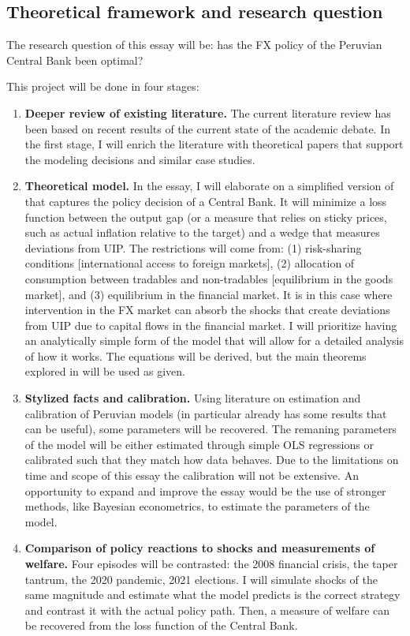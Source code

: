 \documentclass[12pt,a4paper]{article}
\begin{document}
\subsection{Theoretical framework and research question}

The research question of this essay will be: has the FX policy of the Peruvian Central Bank been optimal? 

This project will be done in four stages:

\begin{enumerate}
    \item \textbf{Deeper review of existing literature.} The current literature review has been based on recent results of the current state of the academic debate. In the first stage, I will enrich the literature with theoretical papers that support the modeling decisions and similar case studies.
    
    \item \textbf{Theoretical model.} In the essay, I will elaborate on a simplified version of \cite{itskhokimukhin2025} that captures the policy decision of a Central Bank. It will minimize a loss function between the output gap (or a measure that relies on sticky prices, such as actual inflation relative to the target) and a wedge that measures deviations from UIP. The restrictions will come from: (1) risk-sharing conditions [international access to foreign markets], (2) allocation of consumption between tradables and non-tradables [equilibrium in the goods market], and (3) equilibrium in the financial market. It is in this case where intervention in the FX market can absorb the shocks that create deviations from UIP due to capital flows in the financial market. I will prioritize having an analytically simple form of the model that will allow for a detailed analysis of how it works. The equations will be derived, but the main theorems explored in \cite{itskhokimukhin2025} will be used as given.
    
    \item \textbf{Stylized facts and calibration.} Using literature on estimation and calibration of Peruvian models (in particular \cite{MONTORO2023102825} already has some results that can be useful), some parameters will be recovered. The remaning parameters of the model will be either estimated through simple OLS regressions or calibrated such that they match how data behaves. Due to the limitations on time and scope of this essay the calibration will not be extensive. An opportunity to expand and improve the essay would be the use of stronger methods, like Bayesian econometrics, to estimate the parameters of the model.
    
    \item \textbf{Comparison of policy reactions to shocks and measurements of welfare.} Four episodes will be contrasted: the 2008 financial crisis, the taper tantrum, the 2020 pandemic, 2021 elections. I will simulate shocks of the same magnitude and estimate what the model predicts is the correct strategy and contrast it with the actual policy path. Then, a measure of welfare can be recovered from the loss function of the Central Bank.
    
\end{enumerate}
\end{document}
